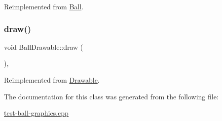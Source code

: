 Reimplemented from \hyperlink{classBall_a4a575db97fe36b3caa001ade4affeb18}{Ball}.

\mbox{\label{classBallDrawable_ae7cf6aaf513598338f14fc5c04bb7aed}} 
\subsubsection{\texorpdfstring{draw()}{draw()}}
{\footnotesize\ttfamily void Ball\+Drawable\+::draw (\begin{DoxyParamCaption}{ }\end{DoxyParamCaption})\hspace{0.3cm}{\ttfamily [inline]}, {\ttfamily [virtual]}}



Reimplemented from \hyperlink{classDrawable_a1231e00fe6022c2ff0e8d61fd23c5c23}{Drawable}.



The documentation for this class was generated from the following file\+:\begin{DoxyCompactItemize}
\item 
\hyperlink{test-ball-graphics_8cpp}{test-\/ball-\/graphics.\+cpp}\end{DoxyCompactItemize}
